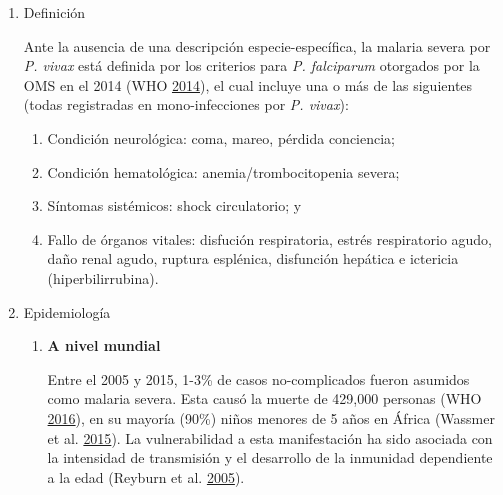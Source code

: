 \documentclass[a4paper]{article}
\providecommand{\tightlist}{%
  \setlength{\itemsep}{0pt}\setlength{\parskip}{0pt}}
\begin{document}
\begin{enumerate}
\def\labelenumi{\alph{enumi}.}
\item
  Definición

  Ante la ausencia de una descripción especie-específica, la malaria
  severa por \emph{P. vivax} está definida por los criterios para
  \emph{P. falciparum} otorgados por la OMS en el 2014 (WHO
  \protect\hyperlink{ref-WHO2014severe}{2014}), el cual incluye una o
  más de las siguientes (todas registradas en mono-infecciones por
  \emph{P. vivax}):

  \begin{enumerate}
  \def\labelenumii{\arabic{enumii}.}
  \tightlist
  \item
    Condición neurológica: coma, mareo, pérdida conciencia;
  \item
    Condición hematológica: anemia/trombocitopenia severa;
  \item
    Síntomas sistémicos: shock circulatorio; y
  \item
    Fallo de órganos vitales: disfución respiratoria, estrés
    respiratorio agudo, daño renal agudo, ruptura esplénica, disfunción
    hepática e ictericia (hiperbilirrubina).
  \end{enumerate}
\item
  Epidemiología

  \begin{enumerate}
  \def\labelenumii{\roman{enumii}.}
  \item
    \textbf{A nivel mundial}

    Entre el 2005 y 2015, 1-3\% de casos no-complicados fueron asumidos
    como malaria severa. Esta causó la muerte de 429,000 personas (WHO
    \protect\hyperlink{ref-WHO2016world}{2016}), en su mayoría (90\%)
    niños menores de 5 años en África (Wassmer et al.
    \protect\hyperlink{ref-wassmer2015}{2015}). La vulnerabilidad a esta
    manifestación ha sido asociada con la intensidad de transmisión y el
    desarrollo de la inmunidad dependiente a la edad (Reyburn et al.
    \protect\hyperlink{ref-reyburn2015}{2005}).


\end{enumerate}
\end{enumerate}
\end{document}
